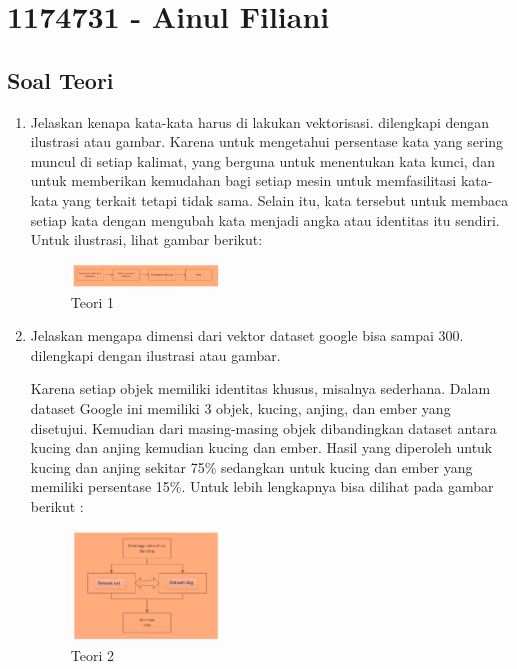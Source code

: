 \section{1174731 - Ainul Filiani}
\subsection{Soal Teori}
\begin{enumerate}

	\item Jelaskan kenapa kata-kata harus di lakukan vektorisasi. dilengkapi dengan ilustrasi atau gambar.
	\hfill\break
	Karena untuk mengetahui persentase kata yang sering muncul di setiap kalimat, yang berguna untuk menentukan kata kunci, dan untuk memberikan kemudahan bagi setiap mesin untuk memfasilitasi kata-kata yang terkait tetapi tidak sama. Selain itu, kata tersebut untuk membaca setiap kata dengan mengubah kata menjadi angka atau identitas itu sendiri. Untuk ilustrasi, lihat gambar berikut: 

	\begin{figure}[H]
	\centering
		\includegraphics[width=4cm]{figures/1174073/tugas5/materi/teori1.PNG}
		\caption{Teori 1}
	\end{figure}

	\item Jelaskan mengapa dimensi dari vektor dataset google bisa sampai 300. dilengkapi dengan ilustrasi atau gambar.

	\hfill\break
	Karena setiap objek memiliki identitas khusus, misalnya sederhana. Dalam dataset Google ini memiliki 3 objek, kucing, anjing, dan ember yang disetujui. Kemudian dari masing-masing objek dibandingkan dataset antara kucing dan anjing kemudian kucing dan ember. Hasil yang diperoleh untuk kucing dan anjing sekitar 75\% sedangkan untuk kucing dan ember yang memiliki persentase 15\%. Untuk lebih lengkapnya bisa dilihat pada gambar berikut : 

	\begin{figure}[H]
	\centering
		\includegraphics[width=4cm]{figures/1174073/tugas5/materi/teori2.PNG}
		\caption{Teori 2}
	\end{figure}
	

\end{enumerate}
